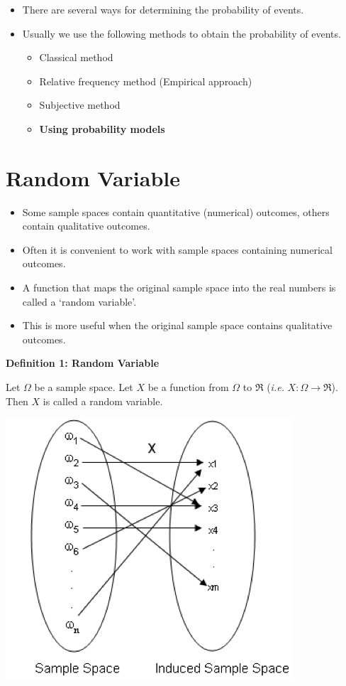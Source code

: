 \documentclass[]{book}
\providecommand{\tightlist}{%
  \setlength{\itemsep}{0pt}\setlength{\parskip}{0pt}}
\begin{document}
\begin{itemize}
\tightlist
\item
  There are several ways for determining the probability of events.
\item
  Usually we use the following methods to obtain the probability of events.

  \begin{itemize}
  \tightlist
  \item
    Classical method
  \item
    Relative frequency method (Empirical approach)
  \item
    Subjective method
  \item
    \textbf{Using probability models}
  \end{itemize}
\end{itemize}

\newpage

\hypertarget{random-variable}{%
\section{Random Variable}\label{random-variable}}

\begin{itemize}
\tightlist
\item
  Some sample spaces contain quantitative (numerical) outcomes, others contain qualitative outcomes.
\item
  Often it is convenient to work with sample spaces containing numerical outcomes.
\item
  A function that maps the original sample space into the real numbers is called a `random variable'.
\item
  This is more useful when the original sample space contains qualitative outcomes.
\end{itemize}

\textbf{Definition 1: Random Variable}

Let \(\Omega\) be a sample space. Let \(X\) be a function from \(\Omega\) to \(\Re\) (\emph{i.e.} \(X:\Omega \rightarrow \Re\)). Then \(X\) is called a random variable.

\begin{center}\includegraphics[width=0.5\linewidth]{figure/Ch1_F1} \end{center}
\end{document}
